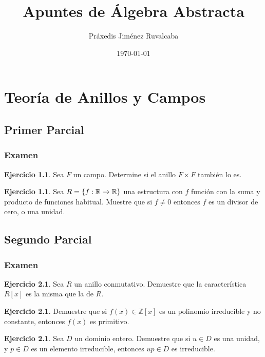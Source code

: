 \documentclass[11pt,a4paper,oneside]{report}
\title{Apuntes de Álgebra Abstracta}
\author{Práxedis Jiménez Ruvalcaba}
\date{\today}
\theoremstyle{definition}
\newtheorem{ejercicio}[definicion]{Ejercicio}
\theoremstyle{plain}
\theoremstyle{remark}
\newcommand{\Z}{\mathbb{Z}}
\newcommand{\R}{\mathbb{R}}
\DeclarePairedDelimiter{\conj}{\{}{\}}
\begin{document}
\maketitle
\tableofcontents

\part{Teoría de Anillos y Campos}

\chapter{Primer Parcial}

\section{Examen}

\begin{ejercicio}
  Sea $F$ un campo. Determine si el anillo $F \times F$ también lo es.
\end{ejercicio}

\begin{ejercicio}
Sea $R=\conj{f:\R\rightarrow\R}$ una estructura con $f$ función con la suma y producto de funciones habitual.
Muestre que si $f \not=0$ entonces $f$ es un divisor de cero, o una unidad.
\end{ejercicio}

\chapter{Segundo Parcial}

\section{Examen}

\begin{ejercicio}
Sea $R$ un anillo conmutativo. Demuestre que la característica $R[x]$ es la misma que la de $R$.
\end{ejercicio}

\begin{ejercicio}
Demuestre que si $f(x) \in \Z [x]$ es un polinomio irreducible y no constante, entonces $f(x)$ es primitivo.
\end{ejercicio}

\begin{ejercicio}
Sea $D$ un dominio entero. Demuestre que si $u \in D$ es una unidad, y $p\in D$ es un elemento irreducible, 
entonces $up \in D$ es irreducible.
\end{ejercicio}
\end{document}
